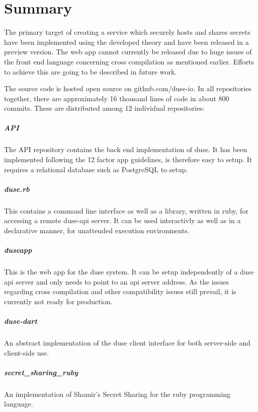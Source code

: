 \chapter{Summary}

The primary target of creating a service which securely hosts and shares
secrets have been implemented using the developed theory and have been released
in a preview version. The web app cannot currently be released due to huge
issues of the front end language concerning cross compilation as mentioned
earlier. Efforts to achieve this are going to be described in future work.

The source code is hosted open source on github.com/duse-io.  In all
repositories together, there are approximately 16 thousand lines of code in
about 800 commits. These are distributed among 12 individual repositories:

\paragraph{API} The API repository contains the back end implementation of
duse. It has been implemented following the 12 factor app guidelines, is
therefore easy to setup. It requires a relational database such as PostgreSQL
to setup.

\paragraph{duse.rb} This contains a command line interface as well as a
library, written in ruby, for accessing a remote duse-api server. It can be
used interactivly as well as in a declarative manner, for unattended execution
environments.

\paragraph{duseapp} This is the web app for the duse system. It can be
setup independently of a duse api server and only needs to point to an
api server address. As the issues regarding cross compilation and other
compatibility issues still prevail, it is currently not ready for production.

\paragraph{duse-dart} An abstract implementation of the duse client interface
for both server-side and client-side use.

\paragraph{secret\_sharing\_ruby} An implementation of Shamir's Secret Sharing
for the ruby programming language.

